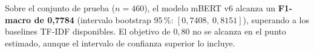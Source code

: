 Sobre el conjunto de prueba ($n = 460$), el modelo mBERT v6 alcanza un \textbf{F1-macro de 0{,}7784} (intervalo bootstrap 95\,\%: $[0{,}7408,\ 0{,}8151]$), superando a los baselines TF-IDF disponibles. El objetivo de $0{,}80$ no se alcanza en el punto estimado, aunque el intervalo de confianza superior lo incluye.
